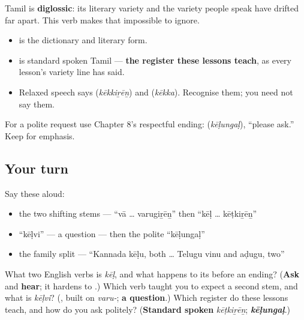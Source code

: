 \begin{culture}
Tamil is \textbf{diglossic}: its literary variety and the variety people speak have drifted far apart. This verb makes that impossible to ignore.

\begin{itemize}
\raggedright
  \item \textbf{} is the dictionary and literary form.
  \item \textbf{} is standard spoken Tamil — \textbf{the register these lessons teach}, as every lesson's variety line has said.
  \item Relaxed speech says \textbf{} (\emph{kēkkiṟēṉ}) and \textbf{} (\emph{kēkka}). Recognise them; you need not say them.
\end{itemize}

For a polite request use Chapter 8's respectful ending: \textbf{} (\emph{kēḷungaḷ}), \textquotedblleft{}please ask.\textquotedblright{} Keep \textbf{} for emphasis.
\end{culture}

\subsection*{Your turn}
Say these aloud:

\begin{itemize}
\raggedright
  \item the two shifting stems — \textquotedblleft{}vā … varugiṟēṉ\textquotedblright{} then \textquotedblleft{}kēḷ … kēṭkiṟēṉ\textquotedblright{}
  \item \textquotedblleft{}kēḷvi\textquotedblright{} — a question — then the polite \textquotedblleft{}kēḷungaḷ\textquotedblright{}
  \item the family split — \textquotedblleft{}Kannada kēḷu, both … Telugu vinu and aḍugu, two\textquotedblright{}
\end{itemize}

\begin{tcolorbox}[breakable,colback=teal!4,colframe=teal!35!black,title={Before you move on}]
What two English verbs is \emph{kēḷ}, and what happens to its \textbf{} before an ending? (\textbf{Ask} and \textbf{hear}; it hardens to \textbf{}.) Which verb taught you to expect a second stem, and what is \emph{kēḷvi}? (\emph{\textbf{}}, built on \emph{varu-}; \textbf{a question}.) Which register do these lessons teach, and how do you ask politely? (\textbf{Standard spoken} \emph{kēṭkiṟēṉ}; \emph{\textbf{kēḷungaḷ}}.)
\end{tcolorbox}
